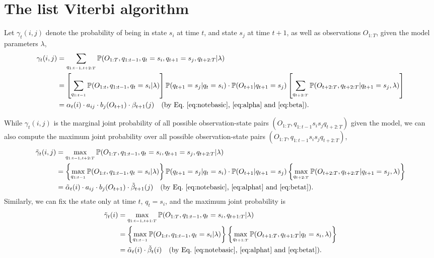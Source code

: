 \section{The list Viterbi algorithm}
\label{sec:lva}

Let $\gamma_t(i,j)$ denote the probability of being in state $s_i$ at time $t$, and state $s_j$ at time $t\!+\!1$, 
as well as observations $O_{1:T}$, given the model parameters $\lambda$, \ie
\begin{equation}
\label{eq:gamma}
\begin{aligned}
\gamma_t(i,j) 
&= \sum_{q_{1:t-1,t+2:T}} \mathbb{P}(O_{1:T}, q_{1:t-1}, q_t = s_i, q_{t+1} = s_j, q_{t+2:T} |\lambda) \\
&= \left[ \sum_{q_{1:t-1}} \mathbb{P}(O_{1:t}, q_{1:t-1}, q_t = s_i |\lambda) \right] \mathbb{P}(q_{t+1} = s_j |q_t = s_i) \cdot \mathbb{P}(O_{t+1} |q_{t+1} = s_j) 
   \left[ \sum_{q_{t+2:T}} \mathbb{P}(O_{t+2:T}, q_{t+2:T} |q_{t+1} = s_j, \lambda) \right] \\
&= \alpha_t(i) \cdot a_{ij} \cdot b_j(O_{t+1}) \cdot \beta_{t+1}(j) 
   ~~~ \text{(by Eq.~\ref{eq:notebasic}, \ref{eq:alpha} and \ref{eq:beta})}.
\end{aligned}
\end{equation}

While $\gamma_t(i,j)$ is the marginal joint probability of all possible observation-state pairs $(O_{1:T}, q_{1:t-1} s_i s_j q_{t+2:T})$ given the model,
we can also compute the maximum joint probability over all possible observation-state pairs $(O_{1:T}, q_{1:t-1} s_i s_j q_{t+2:T})$, \ie
\begin{equation}
\label{eq:gammat}
\begin{aligned}
\tilde{\gamma}_t(i,j) 
&= \max_{q_{1:t-1,t+2:T}} \mathbb{P}(O_{1:T}, q_{1:t-1}, q_t = s_i, q_{t+1} = s_j, q_{t+2:T} |\lambda) \\
&= \left\{ \max_{q_{1:t-1}} \mathbb{P}(O_{1:t}, q_{1:t-1}, q_t = s_i |\lambda) \right\} \mathbb{P}(q_{t+1} = s_j |q_t = s_i) \cdot \mathbb{P}(O_{t+1} |q_{t+1} = s_j) 
   \left\{ \max_{q_{t+2:T}} \mathbb{P}(O_{t+2:T}, q_{t+2:T} |q_{t+1} = s_j, \lambda) \right\} \\
&= \tilde{\alpha}_t(i) \cdot a_{ij} \cdot b_j(O_{t+1}) \cdot \tilde{\beta}_{t+1}(j) 
   ~~~ \text{(by Eq.~\ref{eq:notebasic}, \ref{eq:alphat} and \ref{eq:betat})}.
\end{aligned}
\end{equation}
Similarly, we can fix the state only at time $t$, \ie $q_t = s_i$, 
and the maximum joint probability is
\begin{equation}
\label{eq:gammat0}
\begin{aligned}
\tilde{\gamma}_t(i) 
&= \max_{q_{1:t-1,t+1:T}} \mathbb{P}(O_{1:T}, q_{1:t-1}, q_t = s_i, q_{t+1:T} |\lambda) \\
&= \left\{ \max_{q_{1:t-1}} \mathbb{P}(O_{1:t}, q_{1:t-1}, q_t = s_i |\lambda) \right\}  
   \left\{ \max_{q_{t+1:T}} \mathbb{P}(O_{t+1:T}, q_{t+1:T} |q_t = s_i, \lambda) \right\} \\
&= \tilde{\alpha}_t(i) \cdot \tilde{\beta}_t(i) 
   ~~~ \text{(by Eq.~\ref{eq:notebasic}, \ref{eq:alphat} and \ref{eq:betat})}.
\end{aligned}
\end{equation}

